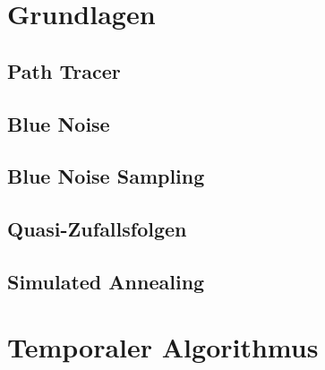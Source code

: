 \vfill
\chapter{Grundlagen}
\label{ch:Grundlagen}


\section{Path Tracer}
\label{ch:Content1:sec:PathTracer}



\newpage
\section{Blue Noise}
\label{ch:Content1:sec:BlueNoise}


\newpage
\section{Blue Noise Sampling}
\label{ch:Content1:sec:BlueNoiseSampling}


\newpage
\section{Quasi-Zufallsfolgen}
\label{ch:Content1:sec:QuasiRandomSequences}



\section{Simulated Annealing}
\label{ch:Content2:sec:SimulatedAnnealing}




\newpage
\chapter{Temporaler Algorithmus}
\label{ch:TemporalerAlgorithmus}





